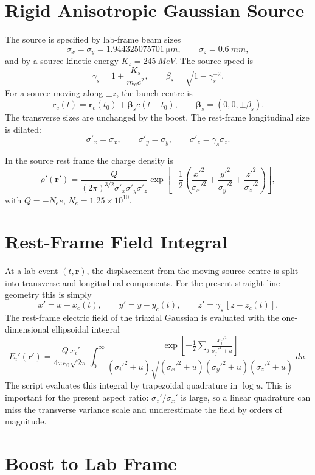 \documentclass[11pt]{article}
\newcommand{\vect}[1]{\boldsymbol{#1}}
\newcommand{\betav}{\boldsymbol{\beta}}
\begin{document}
\section{Rigid Anisotropic Gaussian Source}

The source is specified by lab-frame beam sizes
\[
  \sigma_x = \sigma_y = \SI{1.944325075701}{\micro m},
  \qquad
  \sigma_z = \SI{0.6}{mm},
\]
and by a source kinetic energy \(K_s=\SI{245}{MeV}\).  The source speed is
\[
  \gamma_s = 1 + \frac{K_s}{m_e c^2},
  \qquad
  \beta_s = \sqrt{1-\gamma_s^{-2}}.
\]
For a source moving along \(\pm z\), the bunch centre is
\[
  \vect r_c(t) = \vect r_c(t_0) + \betav_s c (t-t_0),
  \qquad
  \betav_s = (0,0,\pm\beta_s).
\]
The transverse sizes are unchanged by the boost.  The rest-frame longitudinal
size is dilated:
\[
  \sigma'_x=\sigma_x,\qquad
  \sigma'_y=\sigma_y,\qquad
  \sigma'_z=\gamma_s\sigma_z.
\]

In the source rest frame the charge density is
\[
  \rho'(\vect r')
  =
  \frac{Q}{(2\pi)^{3/2}\sigma'_x\sigma'_y\sigma'_z}
  \exp\left[
    -\frac{1}{2}\left(
      \frac{x'^2}{\sigma_x'^2}
      +\frac{y'^2}{\sigma_y'^2}
      +\frac{z'^2}{\sigma_z'^2}
    \right)
  \right],
\]
with \(Q=-N_e e\), \(N_e=1.25\times 10^{10}\).

\section{Rest-Frame Field Integral}

At a lab event \((t,\vect r)\), the displacement from the moving source centre
is split into transverse and longitudinal components.  For the present
straight-line geometry this is simply
\[
  x'=x-x_c(t),\qquad
  y'=y-y_c(t),\qquad
  z'=\gamma_s\,[z-z_c(t)].
\]
The rest-frame electric field of the triaxial Gaussian is evaluated with the
one-dimensional ellipsoidal integral
\[
  E_i'(\vect r')
  =
  \frac{Q\,x_i'}{4\pi\epsilon_0\sqrt{2\pi}}
  \int_0^\infty
  \frac{
    \exp\left[
      -\frac{1}{2}\sum_j
      \frac{x_j'^2}{\sigma_j'^2+u}
    \right]
  }{
    (\sigma_i'^2+u)
    \sqrt{(\sigma_x'^2+u)(\sigma_y'^2+u)(\sigma_z'^2+u)}
  }\,du .
\]
The script evaluates this integral by trapezoidal quadrature in
\(\log u\).  This is important for the present aspect ratio:
\(\sigma_z'/\sigma_x'\) is large, so a linear quadrature can miss the transverse
variance scale and underestimate the field by orders of magnitude.

\section{Boost to Lab Frame}
\end{document}

